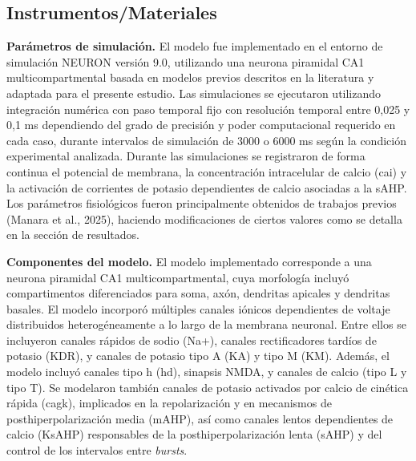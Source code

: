 \documentclass[12pt,a4paper]{report}
\begin{document}
\subsection{Instrumentos/Materiales}

\textbf{Parámetros de simulación.}
El modelo fue implementado en el entorno de simulación NEURON versión 9.0, utilizando una neurona piramidal CA1 multicompartmental basada en modelos previos descritos en la literatura y adaptada para el presente estudio. Las simulaciones se ejecutaron utilizando integración numérica con paso temporal fijo con resolución temporal entre 0,025 y 0,1 ms dependiendo del grado de precisión y poder computacional requerido en cada caso, durante intervalos de simulación de 3000 o 6000 ms según la condición experimental analizada. Durante las simulaciones se registraron de forma continua el potencial de membrana, la concentración intracelular de calcio (cai) y la activación de corrientes de potasio dependientes de calcio asociadas a la sAHP. Los parámetros fisiológicos fueron principalmente obtenidos de trabajos previos (Manara et al., 2025), haciendo modificaciones de ciertos valores como se detalla en la sección de resultados.

\textbf{Componentes del modelo.}
El modelo implementado corresponde a una neurona piramidal CA1 multicompartmental, cuya morfología incluyó compartimentos diferenciados para soma, axón, dendritas apicales y dendritas basales. El modelo incorporó múltiples canales iónicos dependientes de voltaje distribuidos heterogéneamente a lo largo de la membrana neuronal. Entre ellos se incluyeron canales rápidos de sodio (Na+), canales rectificadores tardíos de potasio (KDR), y canales de potasio tipo A (KA) y tipo M (KM). Además, el modelo incluyó canales tipo h (hd), sinapsis NMDA, y canales de calcio (tipo L y tipo T). 
Se modelaron también canales de potasio activados por calcio de cinética rápida (cagk), implicados en la repolarización y en mecanismos de posthiperpolarización media (mAHP), así como canales lentos dependientes de calcio (KsAHP) responsables de la posthiperpolarización lenta (sAHP) y del control de los intervalos entre \textit{bursts}.
\end{document}
